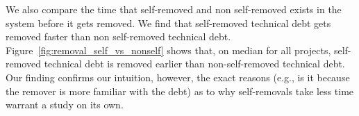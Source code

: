 We also compare the time that self-removed and non self-removed \SATD exists in the system before it gets removed. We find that self-removed technical debt gets removed faster than non self-removed technical debt. Figure~\ref{fig:removal_self_vs_nonself} shows that, on median for all projects, self-removed technical debt is removed earlier than non-self-removed technical debt. Our finding confirms our intuition, however, the exact reasons (e.g., is it because the remover is more familiar with the debt) as to why self-removals take less time warrant a study on its own.



%		
%		



